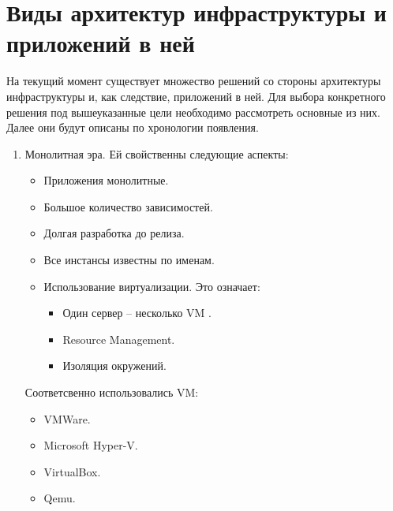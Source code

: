 \section{Виды архитектур инфраструктуры и приложений в ней}
\label{sec:history}

На текущий момент существует множество решений со стороны архитектуры инфраструктуры и, как следствие, приложений в ней. Для выбора конкретного решения под вышеуказанные цели необходимо рассмотреть основные из них. Далее они будут описаны по хронологии появления.

\begin{enumerate}
    \item Монолитная эра. Ей свойственны следующие аспекты:
        \begin{itemize}
            \item Приложения монолитные.
            \item Большое количество зависимостей.
            \item Долгая разработка до релиза.
            \item Все инстансы известны по именам.
            \item Использование виртуализации. Это означает:
                \begin{itemize}
                    \item Один сервер -- несколько VM \cite{wiki:vm}.
                    \item Resource Management.
                    \item Изоляция окружений.
                \end{itemize}
        \end{itemize}

        Соответсвенно использовались VM:
        \begin{itemize}
            \item VMWare.
            \item Microsoft Hyper-V.
            \item VirtualBox.
            \item Qemu.
        \end{itemize}


\end{enumerate}
